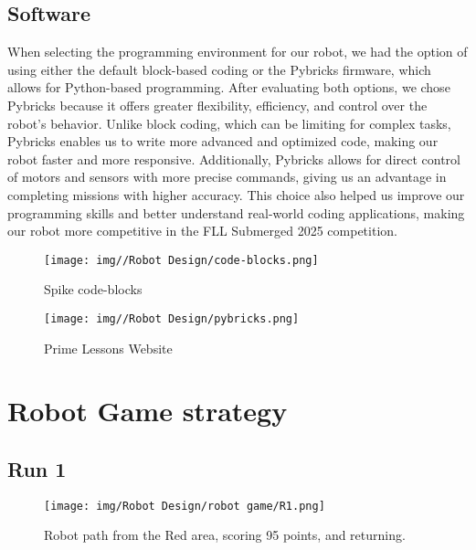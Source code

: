 \subsection{Software}

When selecting the programming environment for our robot, we had the option of using either the default block-based coding or the Pybricks firmware, which allows for Python-based programming. After evaluating both options, we chose Pybricks because it offers greater flexibility, efficiency, and control over the robot’s behavior. Unlike block coding, which can be limiting for complex tasks, Pybricks enables us to write more advanced and optimized code, making our robot faster and more responsive. Additionally, Pybricks allows for direct control of motors and sensors with more precise commands, giving us an advantage in completing missions with higher accuracy. This choice also helped us improve our programming skills and better understand real-world coding applications, making our robot more competitive in the FLL Submerged 2025 competition.


\begin{figure}[h!]
    \centering
    \begin{minipage}{0.45\textwidth}
        \centering
        \texttt{[image: img//Robot Design/code-blocks.png]}
        \caption{Spike code-blocks}
       
    \end{minipage}
    \hfill
    \begin{minipage}{0.45\textwidth}
        \centering
        \texttt{[image: img//Robot Design/pybricks.png]}
        \caption{Prime Lessons Website}
       
    \end{minipage}
\end{figure}

\vspace{1cm}

\section{Robot Game strategy }



\newpage

\subsection{Run 1}
\begin{figure}[h]
    \centering
    \texttt{[image: img/Robot Design/robot game/R1.png]}
    \caption{Robot path from the Red area, scoring 95 points, and returning.}
    \label{fig:robot_path}
\end{figure}
